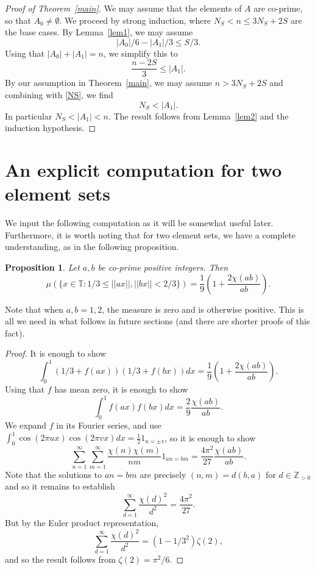 \documentclass[12pt,reqno]{amsart}
\theoremstyle{dotless}
\newtheorem{prop}{Proposition}
\begin{document}
\begin{proof}[Proof of Theorem~\ref{main}]

We may assume that the elements of $A$ are co-prime, so that $A_0 \neq \emptyset$. We proceed by strong induction, where $N_S < n \leq 3N_S + 2S$ are the base cases. By Lemma~\ref{lem1}, we may assume
$$|A_0|/6 - |A_1|/3 \leq S/3.$$
Using that $|A_0| + |A_1| = n$, we simplify this to 
\begin{equation}\label{NS} \frac{n - 2S}{3} \leq |A_1|.\end{equation}
By our assumption in Theorem~\ref{main}, we may assume $n > 3N_S + 2S$ and combining with \eqref{NS}, we find 
$$N_S < |A_1|.$$
In particular $N_S < |A_1| < n$. The result follows from Lemma~\ref{lem2} and the induction hypothesis.



\end{proof}







\section{An explicit computation for two element sets}\label{sec3}

We input the following computation as it will be somewhat useful later. Furthermore, it is worth noting that for two element sets, we have a complete understanding, as in the following proposition. 

\begin{prop}\label{n2} Let $a,b$ be co-prime positive integers. Then
$$\mu(\{x \in \mathbb{T} : 1/3 \leq  ||ax|| , ||bx|| < 2/3 \} )= \frac{1}{9} (1 + \frac{2\chi(ab)}{ab}).$$
\end{prop}
Note that when $a, b = 1,2$, the measure is zero and is otherwise positive. This is all we need in what follows in future sections (and there are shorter proofs of this fact). 
\begin{proof}
It is enough to show
$$\int_0^1 (1/3 + f(ax))(1/3 + f(bx))dx = \frac{1}{9} (1 + \frac{2\chi(ab)}{ab}).$$
Using that $f$ has mean zero, it is enough to show
$$\int_0^1 f(ax) f(bx)dx = \frac{2}{9} \frac{\chi(ab)}{ab}.$$
We expand $f$ in its Fourier series, and use $\int_0^1 \cos (2\pi ux)  \cos (2\pi vx) dx = \frac{1}{2}1_{u = \pm v}$,  so it is enough to show
$$\sum_{n=1}^{\infty} \sum_{m=1}^{\infty} \frac{\chi(n) \chi(m)}{nm} 1_{an = bm} = \frac{4\pi^2}{27}  \frac{\chi(ab)}{ab}.$$
Note that the solutions to $an = bm$ are precisely $(n,m) = d(b,a)$ for $d \in \mathbb{Z}_{>0}$ and so
it remains to establish
$$\sum_{d=1}^{\infty} \frac{\chi(d)^2 }{d^2}= \frac{4\pi^2}{27}  .$$
But by the Euler product representation,
$$\sum_{d=1}^{\infty} \frac{\chi(d)^2}{d^2} = (1-1/3^2) \zeta(2),$$
and so the result follows from $\zeta(2) = \pi^2/6$. 
\end{proof}
\end{document}
